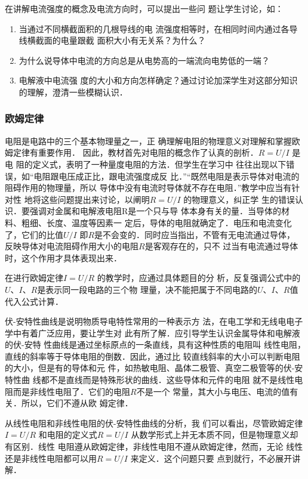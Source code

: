 在讲解电流强度的概念及电流方向时，可以提出一些问
题让学生讨论，如：
\begin{enumerate}
\item 当通过不同横截面积的几根导线的电
流强度相等时，在相同时间内通过各导线横截面的电量跟截
面积大小有无关系？为什么？    
\item 为什么说导体中电流的方向总是从电势高的一端流向电势低的一端？
\item 电解液中电流强
度的大小和方向怎样确定？通过讨论加深学生对这部分知识
的理解，澄清一些模糊认识．
\end{enumerate}


\subsubsection{欧姆定律}

电阻是电路中的三个基本物理量之一，正
确理解电阻的物理意义对理解和掌握欧姆定律有重要作用．
因此，教材首先对电阻的概念作了认真的剖析．$R=U/I$
是电
阻的定义式，表明了一种量度电阻的方法．但学生在学习中
往往出现以下错误，如“电阻跟电压成正比，跟电流强度成反
比．”“既然电阻是表示导体对电流的阻碍作用的物理量，所以
导体中没有电流时导体就不存在电阻．”教学中应当有针对性
地将这些问题提出来讨论，以阐明$R=U/I$
的物理意义，纠正学
生的错误认识．要强调对金属和电解液电阻R是一个只与导
体本身有关的量．当导体的材料、粗细、长度、温度等因素一
定后，导体的电阻就确定了．电压和电流变化了，它们的比值$U/I$
即$R$是不会变的．同时应当指出，不管有无电流通过导体，
反映导体对电流阻碍作用大小的电阻$R$是客观存在的，只不
过当有电流通过导体时，这个作用才具体表现出来．

在进行欧姆定律$I=U/R$
的教学时，应通过具体题目的分
析，反复强调公式中的$U$、$I$、$R$是表示同一段电路的三个物
理量，决不能把属于不同电路的$U$、$I$、$R$值代入公式计算．

伏-安特性曲线是说明物质导电特性常用的一种表示方
法，在电工学和无线电电子学中有着广泛应用，要让学生对
此有所了解．应引导学生认识金属导体和电解液的伏-安特
性曲线是通过坐标原点的一条直线，具有这种性质的电阻叫
线性电阻，直线的斜率等于导体电阻的倒数．因此，通过比
较直线斜率的大小可以判断电阻的大小，但是有的导体和元
件，如热敏电阻、晶体二极管、真空二极管等的伏-安特性曲
线都不是直线而是特殊形状的曲线．这些导体和元件的电阻
就不是线性电阻而是非线性电阻了．它们的电阻$R$不是一个
常量，其大小与电压、电流的值有关．所以，它们不遵从欧
姆定律．

从线性电阻和非线性电阻的伏-安特性曲线的分析，我
们可以看出，尽管欧姆定律$I=U/R$
和电阻的定义式$R=U/I$
从数学形式上并无本质不同，但是物理意义却有区别．线性
电阻遵从欧姆定律，非线性电阻不遵从欧姆定律，然而，无论
线性还是非线性电阻都可以用$R=U/I$
来定义．这个问题只要
点到就行，不必展开讲解．

